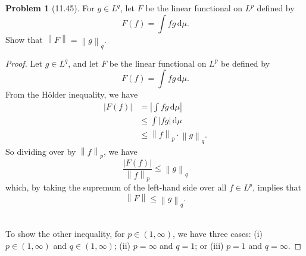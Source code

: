\documentclass[12pt]{article}
\newcommand{\dif}{\, \mathrm{d}}
\newcommand{\norm}[1]{\left\lVert #1 \right\rVert}
\newcommand{\abs}[1]{\left\lvert #1 \right\rvert}
\theoremstyle{definition}
\newtheorem{problem}{Problem}
\begin{document}
\begin{problem}[11.45]
    For \( g \in L^q \), let \( F \) be the linear functional on \( L^p \) defined by 
        \[
            F(f) = \int fg \dif \mu.  
        \]
    Show that \( \norm{F} = \norm{g}_{q} \). 

        \begin{proof}
            Let \( g \in L^q \), and let \( F \) be the linear functional on \( L^p \) be defined by
                \[
                    F(f) = \int fg \dif \mu.  
                \]
            From the H\"{o}lder inequality, we have
                \begin{align*}
                    \abs{F(f)} &= \abs{\int fg \dif \mu} \\
                    &\leq \int \abs{fg} \dif \mu \\
                    &\leq \norm{f}_p \cdot \norm{g}_q.
                \end{align*}
            So dividing over by \( \displaystyle \norm{f}_p \), we have 
                \[
                    \frac{\abs{F(f)}}{\norm{f}_p} \leq \norm{g}_q  
                \]
            which, by taking the supremum of the left-hand side over all \( f \in L^p \), implies that
                \[
                    \norm{F} \leq \norm{g}_q.  
                \]\

            To show the other inequality, for \( p \in (1, \infty) \), we have three cases: (i) \( p \in (1, \infty) \) and \( q \in (1, \infty) \); (ii) \( p = \infty \) and \( q = 1 \); or (iii) \( p = 1 \) and \( q = \infty \).
            

\end{proof}
\end{problem}
\end{document}
